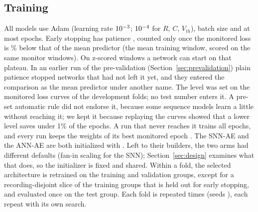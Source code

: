 \documentclass[conference]{IEEEtran}
\begin{document}
\subsection{Training}
\label{sec:training}
\par All models use Adam \cite{kingma2015adam} (learning rate $10^{-3}$; $10^{-4}$ for $R$,
$C$, $V_{th}$), batch size \cfgBatch{} and at most \cfgEpochs{} epochs. Early stopping
\cite{prechelt1998early} has patience \cfgPatience, counted only once the monitored loss is
\cfgMinSkill\% below that of the mean predictor (the mean training window, scored on the same
monitor windows). On z-scored windows a network can start on that plateau. In an earlier run
of the pre-validation (Section~\ref{sec:prevalidation}) plain patience stopped networks that had
not left it yet, and they entered the comparison as the mean predictor under another name. The
level was set on the monitored loss curves of the development folds; no test number enters it.
A pre-set automatic rule did not endorse it, because some sequence models learn a little without
reaching it; we kept it because replaying the curves showed that a lower level saves under 1\%
of the epochs. A run that never reaches it trains all \cfgEpochs{} epochs, and every run keeps
the weights of its best monitored epoch \cite[Alg.~7.1]{goodfellow2016deep}. The SNN-AE and the
ANN-AE are both initialized with \cfgInit{} \cite{glorot2010understanding}. Left to their
builders, the two arms had different defaults (fan-in scaling \cite{he2015delving} for the SNN);
Section~\ref{sec:design} examines what that does, so the initializer is fixed and shared. Within
a fold, the selected architecture is retrained on the training and validation groups, except for
a recording-disjoint slice of the training groups that is held out for early stopping, and
evaluated once on the test group. Each fold is repeated \cfgRuns{} times (seeds \cfgSeeds), each
repeat with its own search.
\end{document}

